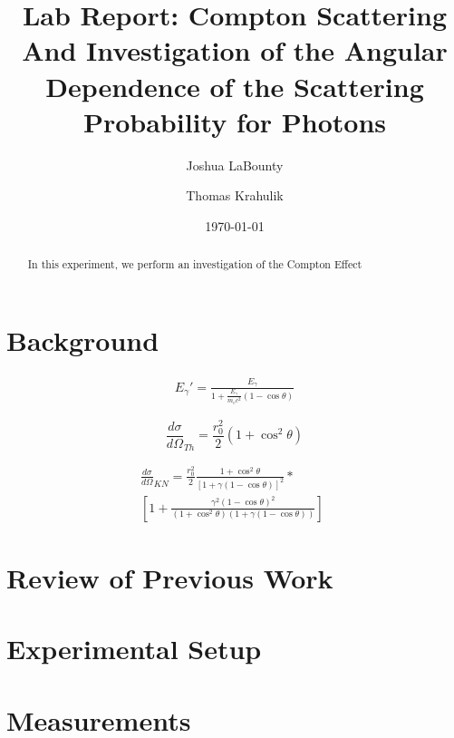 \documentclass[%
 reprint,
 amsmath,amssymb,
 aps,
 pra,
]{revtex4-1}
\begin{document}

\title{\textbf{Lab Report: Compton Scattering} \\ \small{And Investigation of the Angular Dependence of the Scattering Probability for Photons}}
\author{Joshua LaBounty}
\author{Thomas Krahulik}
%

\date{\today}

\begin{abstract}
	In this experiment, we perform an investigation of the Compton Effect
\end{abstract}
\maketitle

\section{Background}

\begin{gather}\label{eq:energy_scatter}
	E_\gamma ' = \frac{E_\gamma}{1 + \frac{E_\gamma}{m_e c^2} (1 - \cos{\theta})}
\end{gather}

\begin{equation}\label{eq:thompson}
	\frac{d \sigma}{d \Omega}_{Th} = \frac{r_0^2}{2}(1+\cos^2{\theta})
\end{equation}

\begin{gather}\label{eq:kn}
	\frac{d \sigma}{d \Omega}_{KN} = \frac{r_0^2}{2} \frac{1 + \cos^2{\theta}}{[1 + \gamma(1 - \cos{\theta})]^2} \nonumber * ~~~~~~~~~~~~\\
	\left[ 1 + \frac{\gamma^2(1 - \cos{\theta})^2}{(1 + \cos^2{\theta})(1+ \gamma(1 - \cos{\theta}))}\right] 
\end{gather}

\section{Review of Previous Work}

\section{Experimental Setup}

\section{Measurements}
\end{document}
